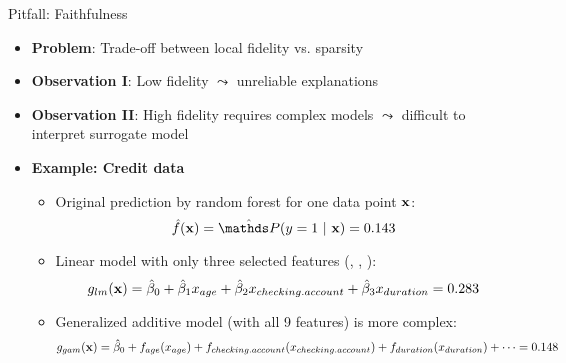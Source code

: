 \documentclass[10pt,compress,t,notes=noshow, xcolor=table]{beamer}
\newcommand{\betah}{\hat{\beta}}
\begin{document}
\begin{frame}[c]{Pitfall: Faithfulness}
\begin{itemize}
	\item \textbf{Problem}: Trade-off between local fidelity vs. sparsity
	\item \textbf{Observation I}: Low fidelity $\leadsto$ unreliable explanations
	\item \textbf{Observation II}: High fidelity requires complex models $\leadsto$ difficult to interpret surrogate model %
	\pause
	\item \textbf{Example: Credit data} 
	\begin{itemize}
	\itemsep0em
	    \item Original prediction by random forest for one data point $\mathbf{x}$: 
	    $$\fh(\xv) = \hat{\P}(y = 1 ~|~ \xv) = 0.143$$
	    \item %
	    Linear model with only three selected features (, , ):
	    $$g_{lm}(\xv) = \betah_0 + \betah_1 x_{age} + \betah_2 x_{checking.account} + \betah_3 x_{duration} = 0.283$$
	    \item Generalized additive model (with all 9 features) is more complex:
    $$%
    g_{gam}(\xv) = \betah_0 + f_{age}(x_{age}) + f_{checking.account}(x_{checking.account}) + f_{duration}(x_{duration}) +  \dots %
    = 0.148$$
	\end{itemize}
\end{itemize}

\end{frame}
\end{document}
